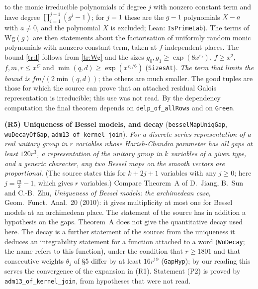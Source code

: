 \documentclass[11pt,letterpaper]{article}
\begin{document}
to the monic irreducible polynomials of degree $j$ with nonzero constant term and have degree
$\prod_{i=1}^{j-1}(g^i-1)$; for $j=1$ these are the $g-1$ polynomials $X-a$ with $a\ne0$, and the polynomial
$X$ is excluded; Lean: \texttt{IsPrimeLab}). The terms of $\mathrm{Wg}(g)$
are then statements about the factorisation of uniformly random monic polynomials with nonzero constant
term, taken at $f$ independent places. The
bound \eqref{tr:I} follows from \eqref{tr:Wg} and the sizes $g_0,g_1\ge\exp(8x^{\varepsilon_z})$, $f\ge x^2$,
$f,m,r\le x^{C}$ and $\min(q,d)\ge\exp(x^{\varepsilon_z/6})$ (\texttt{SizesAt}). \emph{The term that limits the
bound is $fm/(2\min(q,d))$}; the others are much smaller. The good tuples are those for which the source can
prove that an attached residual Galois representation is irreducible; this use was not read. By the
dependency computation the final theorem depends on \texttt{delp\_of\_allRows} and on \texttt{Green}.

\textbf{(R5) Uniqueness of Bessel models, and decay} (\texttt{besselMapUniqGap}, \texttt{wuDecayOfGap},
\texttt{adm13\_of\_kernel\_join}). \emph{For a discrete series representation of a real unitary group in $r$ variables whose Harish-Chandra
parameter has all gaps at least $120r^3$, a representation of the unitary group in $k$ variables of a given
type, and a generic character, any two Bessel maps on the smooth vectors are proportional.} (The source
states this for $k+2j+1$ variables with any $j\ge0$; here $j=\frac m2-1$, which gives $r$ variables.) Compare Theorem~A of D.~Jiang,
B.~Sun and C.-B.~Zhu, \emph{Uniqueness of Bessel models: the archimedean case}, Geom.\ Funct.\ Anal.\ 20 (2010):
it gives multiplicity at most one for Bessel models at an archimedean place. The statement of the source has
in addition a hypothesis on the gaps. Theorem~A does not give the quantitative decay used here. The decay is
a further statement of the source: from the uniqueness it
deduces an integrability statement for a function attached to a word (\texttt{WuDecay}; the
name refers to this function), under the condition that $r\ge1801$ and that consecutive weights $\theta_j$ of \S5 differ
by at least $16r^{19}$ (\texttt{GapHyp}); by our reading this serves the convergence of the expansion in (R1).
Statement (P2) is
proved by \texttt{adm13\_of\_kernel\_join}, from hypotheses that were not read.
\end{document}
